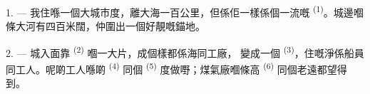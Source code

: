 %
%
%
%
%
%
%

\VUsaut{2.0mm}
\VUsaut{3.0mm}
\VUfilet{16mm}
\VUsaut{5.6mm}
\VUsaut{1.4mm}
\VUsaut{2.2mm}

\VUsaut{3.0mm}

1. --- 我住喺一個大城市度，離大海一百公里，但係佢一樣係個一流嘅
\textsuperscript{(1)}。城邊嗰條大河有四百米闊，仲圍出一個好靚嘅錨地。

2. --- 城入面靠 \textsuperscript{(2)} 嗰一大片，成個樣都係海同工廠，
變成一個 \textsuperscript{(3)}，住嘅淨係船員同工人。呢啲工人喺啲
 \textsuperscript{(4)} 同個 \textsuperscript{(5)} 度做嘢；煤氣廠嗰條高
 \textsuperscript{(6)} 同個老遠都望得到。

